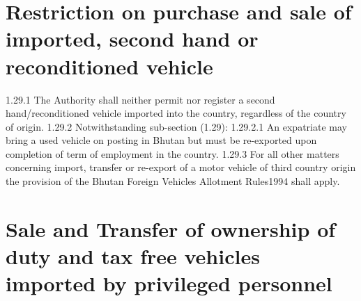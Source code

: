 \documentclass[
]{book}
\begin{document}
\hypertarget{restriction-on-purchase-and-sale-of-imported-second-hand-or-reconditioned-vehicle}{%
\section{Restriction on purchase and sale of imported, second hand or reconditioned vehicle}\label{restriction-on-purchase-and-sale-of-imported-second-hand-or-reconditioned-vehicle}}

1.29.1 The Authority shall neither permit nor register a second hand/reconditioned vehicle imported into the country, regardless of the country of origin.
1.29.2 Notwithstanding sub-section (1.29):
1.29.2.1 An expatriate may bring a used vehicle on posting in Bhutan but must be re-exported upon completion of term of employment in the country.
1.29.3 For all other matters concerning import, transfer or re-export of a motor vehicle of third country origin the provision of the Bhutan Foreign Vehicles Allotment Rules1994 shall apply.

\hypertarget{sale-and-transfer-of-ownership-of-duty-and-tax-free-vehicles-imported-by-privileged-personnel}{%
\section{Sale and Transfer of ownership of duty and tax free vehicles imported by privileged personnel}\label{sale-and-transfer-of-ownership-of-duty-and-tax-free-vehicles-imported-by-privileged-personnel}}
\end{document}

